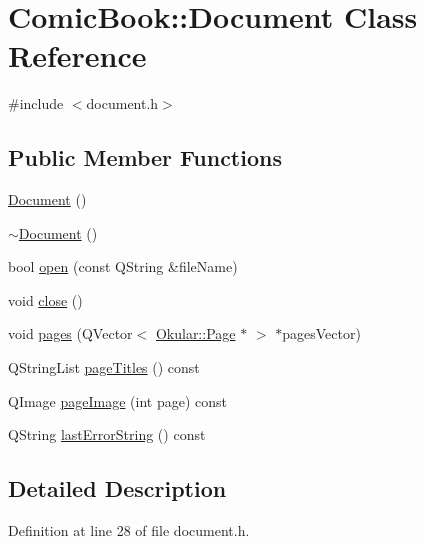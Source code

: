\hypertarget{classComicBook_1_1Document}{\section{Comic\+Book\+:\+:Document Class Reference}
\label{classComicBook_1_1Document}
}


{\ttfamily \#include $<$document.\+h$>$}

\subsection*{Public Member Functions}
\begin{DoxyCompactItemize}
\item 
\hyperlink{classComicBook_1_1Document_acdbcbe550084e8c20f4f67eb229ad66a}{Document} ()
\item 
\hyperlink{classComicBook_1_1Document_ac2e3f62307dc22baac21ddc10fa1609c}{$\sim$\+Document} ()
\item 
bool \hyperlink{classComicBook_1_1Document_a9048327326e87d025b2af2499e8987da}{open} (const Q\+String \&file\+Name)
\item 
void \hyperlink{classComicBook_1_1Document_ae9b8bb9ab6fbf42f47b573e95a5a1198}{close} ()
\item 
void \hyperlink{classComicBook_1_1Document_ac9b4abfbf45273ef03051677c7abb00b}{pages} (Q\+Vector$<$ \hyperlink{classOkular_1_1Page}{Okular\+::\+Page} $\ast$ $>$ $\ast$pages\+Vector)
\item 
Q\+String\+List \hyperlink{classComicBook_1_1Document_a71c9c6cc020b500b3cf093fc5f039c92}{page\+Titles} () const 
\item 
Q\+Image \hyperlink{classComicBook_1_1Document_ae572a3b695f4300eb3ddf76bbcd3b1dd}{page\+Image} (int page) const 
\item 
Q\+String \hyperlink{classComicBook_1_1Document_a26f06a190450786328eceb700ebfe45e}{last\+Error\+String} () const 
\end{DoxyCompactItemize}


\subsection{Detailed Description}


Definition at line 28 of file document.\+h.



